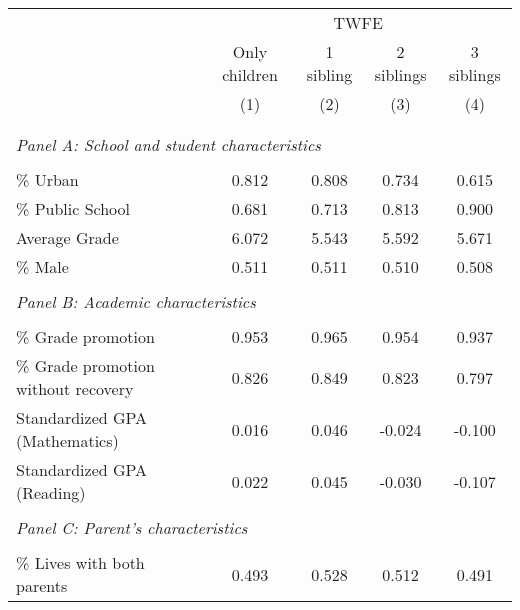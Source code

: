 \makeatletter
{}
{
\makeatother
\begin{tabular}{lcccc}
\toprule
\cmidrule(lr){2-4}
& \multicolumn{4}{c}{TWFE}  \\
\cmidrule(lr){2-4}
& Only children & 1 sibling & 2 siblings & 3 siblings  \\
\cmidrule(lr){2-2} \cmidrule(lr){3-3} \cmidrule(lr){4-4} \cmidrule(lr){5-5}
& (1) & (2) & (3) & (4)\\
\bottomrule
&  &  &  & \\
&  &  &   \\
\multicolumn{4}{l}{\textit{Panel A: School and student characteristics}} \\
            &            &            &            &            \\
\% Urban    &       0.812&       0.808&       0.734&       0.615\\
\% Public School&       0.681&       0.713&       0.813&       0.900\\
Average Grade&       6.072&       5.543&       5.592&       5.671\\
\% Male     &       0.511&       0.511&       0.510&       0.508\\
&  &  &   \\
\multicolumn{4}{l}{\textit{Panel B: Academic characteristics}} \\
            &            &            &            &            \\
\% Grade promotion&       0.953&       0.965&       0.954&       0.937\\
\% Grade promotion without recovery&       0.826&       0.849&       0.823&       0.797\\
Standardized GPA (Mathematics) &       0.016&       0.046&      -0.024&      -0.100\\
Standardized GPA (Reading)&       0.022&       0.045&      -0.030&      -0.107\\
&  &  &   \\
\multicolumn{4}{l}{\textit{Panel C: Parent's characteristics}} \\
            &            &            &            &            \\
\% Lives with both parents&       0.493&       0.528&       0.512&       0.491\\

\end{tabular}}
